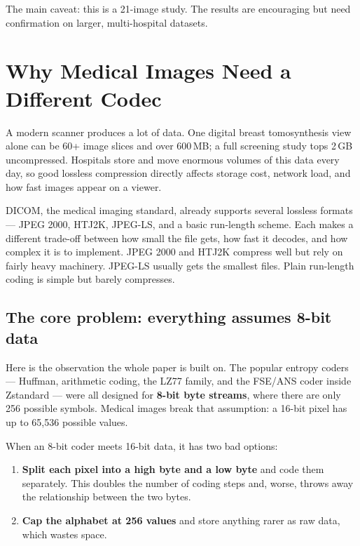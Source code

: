 \documentclass[11pt]{article}
\begin{document}
The main caveat: this is a 21-image study. The results are encouraging but
need confirmation on larger, multi-hospital datasets.

\section{Why Medical Images Need a Different Codec}

A modern scanner produces a lot of data. One digital breast tomosynthesis
view alone can be 60+ image slices and over 600\,MB; a full screening study
tops 2\,GB uncompressed. Hospitals store and move enormous volumes of this
data every day, so good lossless compression directly affects storage cost,
network load, and how fast images appear on a viewer.

DICOM, the medical imaging standard, already supports several lossless
formats --- JPEG 2000, HTJ2K, JPEG-LS, and a basic run-length scheme. Each
makes a different trade-off between how small the file gets, how fast it
decodes, and how complex it is to implement. JPEG 2000 and HTJ2K compress
well but rely on fairly heavy machinery. JPEG-LS usually gets the smallest
files. Plain run-length coding is simple but barely compresses.

\subsection{The core problem: everything assumes 8-bit data}

Here is the observation the whole paper is built on. The popular entropy
coders --- Huffman, arithmetic coding, the LZ77 family, and the FSE/ANS coder
inside Zstandard --- were all designed for \textbf{8-bit byte streams}, where
there are only 256 possible symbols. Medical images break that assumption: a
16-bit pixel has up to 65,536 possible values.

When an 8-bit coder meets 16-bit data, it has two bad options:

\begin{enumerate}
  \item \textbf{Split each pixel into a high byte and a low byte} and code them
  separately. This doubles the number of coding steps and, worse, throws
  away the relationship between the two bytes.
  \item \textbf{Cap the alphabet at 256 values} and store anything rarer as raw
  data, which wastes space.
\end{enumerate}
\end{document}

